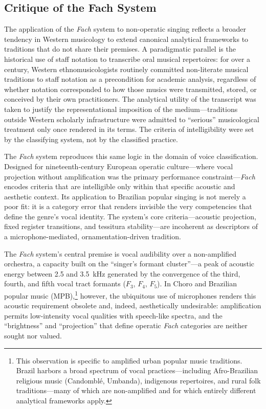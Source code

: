 \documentclass[review,3p,number]{elsarticle}
\begin{document}
\subsection{Critique of the Fach System}
\label{sec:fach_critique}

The application of the \emph{Fach} system to non-operatic singing reflects a broader
tendency in Western musicology to extend canonical analytical frameworks to traditions
that do not share their premises. A paradigmatic parallel is the historical use of
staff notation to transcribe oral musical repertoires: for over a century, Western
ethnomusicologists routinely committed non-literate musical traditions to staff notation
as a precondition for academic analysis, regardless of whether notation corresponded
to how those musics were transmitted, stored, or conceived by their own
practitioners.\cite{nettl1985,schuiling2019} The analytical utility of the transcript
was taken to justify the representational imposition of the medium---traditions outside
Western scholarly infrastructure were admitted to ``serious'' musicological treatment
only once rendered in its terms. The criteria of intelligibility were set by the
classifying system, not by the classified practice.

The \emph{Fach} system reproduces this same logic in the domain of voice
classification. Designed for nineteenth-century European operatic culture---where vocal
projection without amplification was the primary performance constraint---\emph{Fach}
encodes criteria that are intelligible only within that specific acoustic and aesthetic
context. Its application to Brazilian popular singing is not merely a poor fit: it is a
category error that renders invisible the very competencies that define the genre's
vocal identity. The system's core criteria---acoustic projection, fixed register
transitions, and tessitura stability---are incoherent as descriptors of a
microphone-mediated, ornamentation-driven tradition.

The \emph{Fach} system's central premise is vocal audibility over a non-amplified
orchestra, a capacity built on the ``singer's formant cluster''---a peak of acoustic
energy between 2.5 and 3.5~kHz generated by the convergence of the third, fourth,
and fifth vocal tract formants ($F_3$, $F_4$,
$F_5$).\cite{sundberg1974,sundberg1987} In Choro and Brazilian popular music (MPB),\footnote{This observation is specific to
amplified urban popular music traditions. Brazil harbors a broad spectrum of vocal
practices---including Afro-Brazilian religious music (Candomblé, Umbanda), indigenous
repertoires, and rural folk traditions---many of which are non-amplified and for which
entirely different analytical frameworks apply.} however, the ubiquitous use of
microphones renders this acoustic requirement obsolete
and, indeed, aesthetically undesirable: amplification permits low-intensity vocal
qualities with speech-like spectra, and the ``brightness'' and ``projection'' that
define operatic \emph{Fach} categories are neither sought nor valued.\cite{bourne2012}
\end{document}
